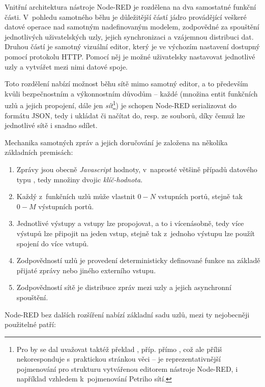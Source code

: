 Vnitřní architektura nástroje Node-RED je rozdělena na dva samostatné funkční části.
V~pohledu samotného běhu je důležitější částí jádro provádějící veškeré datové operace nad samotným nadefinovaným
modelem, zodpovědné za spouštění jednotlivých uživatelských uzly, jejich synchronizaci a vzájemnou distribuci dat.
Druhou částí je samotný vizuální editor, který je ve výchozím nastavení dostupný pomocí protokolu HTTP. Pomocí něj je
možné uživatelsky nastavovat jednotlivé uzly a vytvářet mezi nimi datové spoje.

Toto rozdělení nabízí možnost běhu sítě mimo samotný editor, a to především kvůli bezpečnostním a
výkonnostním důvodům -- každé  (množina entit funkčních uzlů a jejich propojení, dále jen
\emph{sít}\footnote{Pro  by se dal uvažovat taktéž překlad ,
příp. přímo , což ale příliš nekoresponduje s~praktickou stránkou věci --  je reprezentativnější
pojmenování pro strukturu vytvářenou editorem nástroje Node-RED, i například vzhledem k~pojmenování Petriho sítí.}) je
schopen Node-RED serializovat do formátu JSON, tedy i ukládat či načítat do, resp. ze souborů, díky čemuž lze jednotlivé
sítě i snadno sdílet.

Mechanika samotných zpráv a jejich doručování je založena na několika základních premisách:
\begin{enumerate}
    \item Zprávy jsou obecně \emph{Javascript} hodnoty, v~naprosté většině případů datového typu ,
    tedy množiny dvojic \emph{klíč-hodnota}.
    \item Každý z~funkčních uzlů může vlastnit $0-N$ vstupních portů, stejně tak $0-M$ výstupních portů.
    \item Jednotlivé výstupy a vstupy lze propojovat, a to i vícenásobně, tedy více výstupů lze připojit na jeden vstup,
    stejně tak z~jednoho výstupu lze použít spojení do více vstupů.
    \item Zodpovědností uzlů je provedení deterministicky definované funkce na základě přijaté zprávy nebo
    jiného externího vstupu.
    \item Zodpovědností sítě je distribuce zpráv mezi uzly a jejich asynchronní spouštění.
\end{enumerate}

Node-RED bez dalších rozšíření nabízí základní sadu uzlů, mezi ty nejobecněji použitelné patří:

